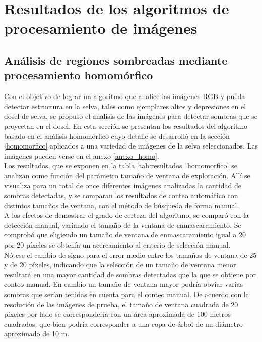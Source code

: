 \section{Resultados de los algoritmos de procesamiento de imágenes}
\subsection{Análisis de regiones sombreadas mediante procesamiento homomórfico}

Con el objetivo de lograr un algoritmo que analice las imágenes RGB y pueda detectar estructura en la selva, tales como ejemplares altos y depresiones en el dosel de selva, se propuso el análisis de las imágenes para detectar sombras que se proyectan en el dosel. En esta sección se presentan los resultados del algoritmo basado en el análisis homomórfico cuyo detalle se desarrolló en la sección \ref{homomorfico} aplicados a una variedad de imágenes de la selva seleccionados. Las imágenes pueden verse en el anexo \ref{anexo_homo}.\\ Los resultados, que se exponen en la tabla \ref{tab:resultados_homomorfico} se analizan como función del parámetro tamaño de ventana de exploración.
Allí se visualiza para un total de once diferentes imágenes analizadas la cantidad de sombras detectadas, y se comparan los resultados de conteo automático con distintos tamaños de ventana, con el método de búsqueda de forma manual. \\
A los efectos de demostrar el grado de certeza del algoritmo, se comparó con la detección manual, variando el tamaño de la ventana de enmascaramiento. Se comprobó que eligiendo un tamaño de ventana de enmascaramiento igual a 20 por 20 píxeles se obtenía un acercamiento al criterio de selección manual.\\
Nótese el cambio de signo para el error medio entre los tamaños de ventana de 25 y de 20 píxeles, indicando que la selección de un tamaño de ventana menor resultará en una mayor cantidad de sombras detectadas que la que se obtiene por conteo manual. En cambio un tamaño de ventana mayor podría obviar varias sombras que serían tenidas en cuenta para el conteo manual. De acuerdo con la resolución de las imágenes de prueba, el tamaño de ventana cuadrada de 20 píxeles por lado se correspondería con un área aproximada de 100 metros cuadrados, que bien podría corresponder a una copa de árbol de un diámetro aproximado de 10 m.\\
